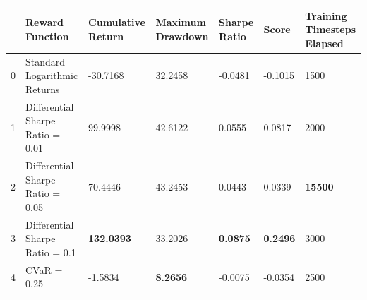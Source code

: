 \begin{tabular}{lllllll}
\toprule
 & Reward Function & Cumulative Return & Maximum Drawdown & Sharpe Ratio & Score & Training Timesteps Elapsed \\
\midrule
0 & Standard Logarithmic Returns & -30.7168 & 32.2458 & -0.0481 & -0.1015 & 1500 \\
1 & Differential Sharpe Ratio = 0.01 & 99.9998 & 42.6122 & 0.0555 & 0.0817 & 2000 \\
2 & Differential Sharpe Ratio = 0.05 & 70.4446 & 43.2453 & 0.0443 & 0.0339 & \textbf{15500} \\
3 & Differential Sharpe Ratio = 0.1 & \textbf{132.0393} & 33.2026 & \textbf{0.0875} & \textbf{0.2496} & 3000 \\
4 & CVaR = 0.25 & -1.5834 & \textbf{8.2656} & -0.0075 & -0.0354 & 2500 \\
\bottomrule
\end{tabular}
